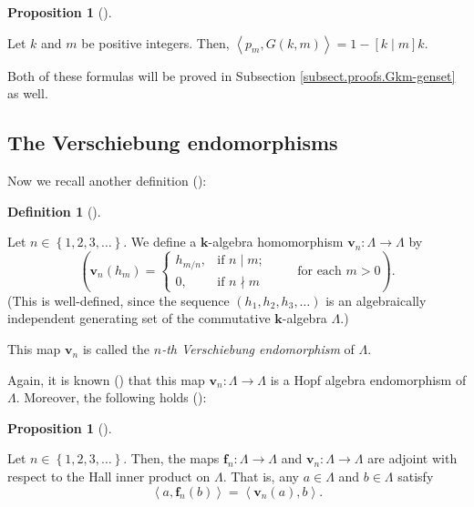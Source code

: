 \documentclass[numbers=enddot,12pt,final,onecolumn,notitlepage]{scrartcl}%
\theoremstyle{definition}
\newtheorem{prop}[theo]{Proposition}
\newenvironment{proposition}[1][]
{\begin{prop}[#1]\begin{leftbar}}
{\end{leftbar}\end{prop}}
\newtheorem{defi}[theo]{Definition}
\newenvironment{definition}[1][]
{\begin{defi}[#1]\begin{leftbar}}
{\end{leftbar}\end{defi}}
\begin{document}
\begin{proposition}
\label{prop.hall-pmGkm}Let $k$ and $m$ be positive integers. Then,
$\left\langle p_{m},G\left(  k,m\right)  \right\rangle =1-\left[  k\mid
m\right]  k$.
\end{proposition}

Both of these formulas will be proved in Subsection
\ref{subsect.proofs.Gkm-genset} as well.

\subsection{The Verschiebung endomorphisms}

Now we recall another definition (\cite[Exercise 2.9.10]{GriRei}):

\begin{definition}
\label{def.vn} Let $n\in\left\{  1,2,3,\ldots\right\}  $. We define a
$\mathbf{k}$-algebra homomorphism $\mathbf{v}_{n}:\Lambda\rightarrow\Lambda$
by%
\[
\left(  \mathbf{v}_{n}\left(  h_{m}\right)  =%
\begin{cases}
h_{m/n}, & \text{if }n\mid m;\\
0, & \text{if }n\nmid m
\end{cases}
\ \ \ \ \ \ \ \ \ \ \text{for each }m>0\right)  .
\]
(This is well-defined, since the sequence $\left(  h_{1},h_{2},h_{3}%
,\ldots\right)  $ is an algebraically independent generating set of the
commutative $\mathbf{k}$-algebra $\Lambda$.)

This map $\mathbf{v}_{n}$ is called the $n$\emph{-th Verschiebung
endomorphism} of $\Lambda$.
\end{definition}

Again, it is known (\cite[Exercise 2.9.10(e)]{GriRei}) that this map
$\mathbf{v}_{n}:\Lambda\rightarrow\Lambda$ is a Hopf algebra endomorphism of
$\Lambda$. Moreover, the following holds (\cite[Exercise 2.9.10(f)]{GriRei}):

\begin{proposition}
\label{prop.f-v-dual}Let $n\in\left\{  1,2,3,\ldots\right\}  $. Then, the maps
$\mathbf{f}_{n}:\Lambda\rightarrow\Lambda$ and $\mathbf{v}_{n}:\Lambda
\rightarrow\Lambda$ are adjoint with respect to the Hall inner product on
$\Lambda$. That is, any $a\in\Lambda$ and $b\in\Lambda$ satisfy%
\[
\left\langle a,\mathbf{f}_{n}\left(  b\right)  \right\rangle =\left\langle
\mathbf{v}_{n}\left(  a\right)  ,b\right\rangle .
\]

\end{proposition}
\end{document}
